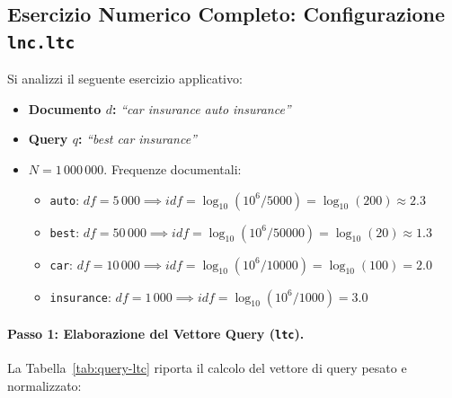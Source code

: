 \FloatBarrier
\subsection{Esercizio Numerico Completo: Configurazione \texttt{lnc.ltc}}
\label{subsec:esercizio-lnc-ltc}

Si analizzi il seguente esercizio applicativo:
\begin{itemize}
    \item \textbf{Documento $d$:} \textit{``car insurance auto insurance''}
    \item \textbf{Query $q$:} \textit{``best car insurance''}
    \item $N = 1\,000\,000$. Frequenze documentali:
    \begin{itemize}
        \item \texttt{auto}: $df = 5\,000 \implies idf = \log_{10}(10^6 / 5000) = \log_{10}(200) \approx 2.3$
        \item \texttt{best}: $df = 50\,000 \implies idf = \log_{10}(10^6 / 50000) = \log_{10}(20) \approx 1.3$
        \item \texttt{car}: $df = 10\,000 \implies idf = \log_{10}(10^6 / 10000) = \log_{10}(100) = 2.0$
        \item \texttt{insurance}: $df = 1\,000 \implies idf = \log_{10}(10^6 / 1000) = 3.0$
    \end{itemize}
\end{itemize}

\paragraph{Passo 1: Elaborazione del Vettore Query (\texttt{ltc}).}
La Tabella~\ref{tab:query-ltc} riporta il calcolo del vettore di query pesato e normalizzato:

\begin{table}[H]
\centering
\small
{}
\caption{Computazione del vettore di query secondo lo schema \texttt{ltc}.}
\label{tab:query-ltc}
\end{table}

